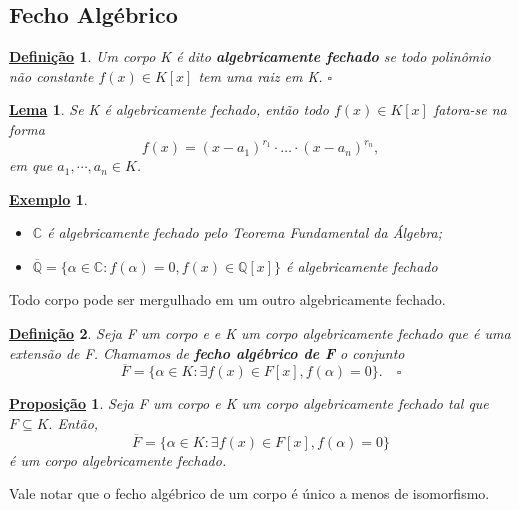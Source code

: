 \documentclass{article}
\newtheorem*{def*}{\underline{Defini\c c\~ao}}
\newtheorem*{lemma*}{\underline{Lema}}
\newtheorem*{prop*}{\underline{Proposi\c c\~ao}}
\newtheorem{example}{\underline{Exemplo}}
\begin{document}
    \subsection{Fecho Algébrico}
    \begin{def*}
      Um corpo K é dito \textbf{algebricamente fechado} se todo polinômio não constante \(f(x)\in K[x]\) tem
      uma raiz em K. \(\square\)
    \end{def*}
    \begin{lemma*}
      Se K é algebricamente fechado, então todo \(f(x)\in K[x]\) fatora-se na forma 
      \[
        f(x) = (x-a_{1})^{r_{1}}\cdot \dotsc \cdot (x-a_{n})^{r_{n}},
      \]
      em que \(a_{1}, \cdots, a_{n}\in K\).
    \end{lemma*}
    \begin{example}
      \begin{itemize}
        \item[1)] \(\mathbb{C}\) é algebricamente fechado pelo Teorema Fundamental da Álgebra;
        \item[2)] \(\overline{\mathbb{Q}} = \{\alpha \in \mathbb{C}: f(\alpha ) = 0, f(x)\in \mathbb{Q}[x]\}\) é algebricamente fechado
      \end{itemize}
    \end{example}
    Todo corpo pode ser mergulhado em um outro algebricamente fechado.
    \begin{def*}
      Seja F um corpo e e K um corpo algebricamente fechado que é uma extensão de F. Chamamos de
      \textbf{fecho algébrico de F} o conjunto 
      \[
        \overline{F} = \{\alpha \in K: \exists f(x)\in F[x], f(\alpha ) = 0\}.\quad\square
      \]
    \end{def*}
    \begin{prop*}
      Seja F um corpo e K um corpo algebricamente fechado tal que \(F \subseteq{K}.\) Então, 
      \[
        \overline{F} = \{\alpha \in K: \exists f(x)\in F[x], f(\alpha ) = 0\}
      \]
      é um corpo algebricamente fechado.
    \end{prop*}
    Vale notar que o fecho algébrico de um corpo é único a menos de isomorfismo.
\end{document}
